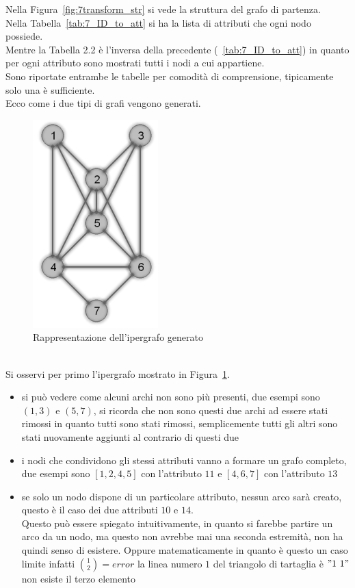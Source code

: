 %
%
\noindent Nella Figura~\ref{fig:7transform_str} si vede la struttura del grafo di partenza.\\
Nella Tabella~\ref{tab:7_ID_to_att} si ha la lista di attributi che ogni nodo possiede.\\
Mentre la Tabella 2.2 %
è l'inversa della precedente (~\ref{tab:7_ID_to_att}) in quanto per ogni attributo sono mostrati tutti i nodi a cui appartiene.\\
Sono riportate entrambe le tabelle per comodità di comprensione, tipicamente solo una è sufficiente.\\
Ecco come i due tipi di grafi vengono generati.
%
\begin{figure}[htp]
	\centering
	\includegraphics{immagini/7transform_hyper}
	\caption{Rappresentazione dell'ipergrafo generato}
	\label{fig:7transform_hyper}
\end{figure}
\\
Si osservi per primo l'ipergrafo mostrato in Figura~\ref{fig:7transform_hyper}.
\begin{itemize}
	\item  si può vedere come alcuni archi non sono più presenti, due esempi sono $(1,3)$ e $(5,7)$, si ricorda che non sono questi due archi ad essere stati rimossi in quanto tutti sono stati rimossi, semplicemente tutti gli altri sono stati nuovamente aggiunti al contrario di questi due
	\item  i nodi che condividono gli stessi attributi vanno a formare un grafo completo, due esempi sono $[1,2,4,5]$ con l'attributo $11$ e $[4,6,7]$ con l'attributo $13$
	\item  se solo un nodo dispone di un particolare attributo, nessun arco sarà creato, questo è il caso dei due attributi $10$ e $14$.\\
	Questo può essere spiegato intuitivamente, in quanto si farebbe partire un arco da un nodo, ma questo non avrebbe mai una seconda estremità, non ha quindi senso di esistere. Oppure matematicamente in quanto è questo un caso limite infatti $ \displaystyle\binom{1}{2} = error$ la linea numero $1$ del triangolo di tartaglia è $"1\ 1"$ non esiste il terzo elemento
\end{itemize}

